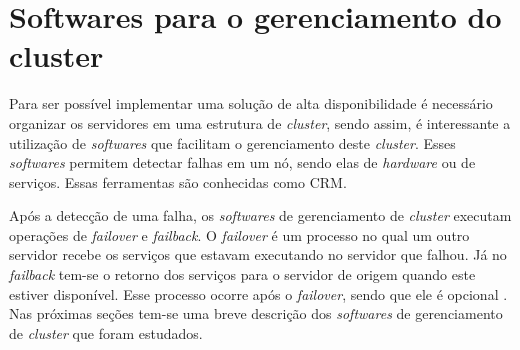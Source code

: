 

\section{Softwares para o gerenciamento do cluster}
\label{section:toolcluster}

Para ser possível implementar uma solução de alta disponibilidade é necessário organizar os servidores em uma estrutura de \textit{cluster},
sendo assim, é interessante a utilização de \textit{softwares} que facilitam o gerenciamento deste \textit{cluster}. Esses \textit{softwares} 
permitem detectar falhas em um nó, sendo elas de \textit{hardware} ou de serviços. Essas ferramentas são conhecidas como \ac{CRM}. 

Após a detecção de uma falha, os \textit{softwares} de gerenciamento de \textit{cluster} executam operações de \textit{failover} e 
\textit{failback}. O \textit{failover} é um processo no qual um outro servidor recebe os serviços que estavam executando no servidor que falhou. 
Já no \textit{failback} tem-se o retorno dos serviços para o servidor de origem quando este estiver disponível. Esse processo ocorre após o 
\textit{failover}, sendo que ele é opcional \cite{bassan2008}. Nas próximas seções tem-se uma breve descrição dos \textit{softwares} de 
gerenciamento de \textit{cluster} que foram estudados.


